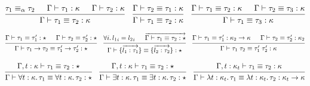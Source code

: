 \documentclass[lualatex,12pt,unicode]{article}
\begin{document}
\pagestyle{empty}

\[
    \begin{prooftree}
        \hypo{\tau_1 \equiv_\alpha \tau_2}
        \hypo{\Gamma \vdash \tau_1: \kappa}
        \hypo{\Gamma \vdash \tau_2: \kappa}
        \infer3{\Gamma \vdash \tau_1 \equiv \tau_2: \kappa}
    \end{prooftree}
    \hspace{1em}
    \begin{prooftree}
        \hypo{\Gamma \vdash \tau_2 \equiv \tau_1: \kappa}
        \infer1{\Gamma \vdash \tau_1 \equiv \tau_2: \kappa}
    \end{prooftree}
    \hspace{1em}
    \begin{prooftree}
        \hypo{\Gamma \vdash \tau_1 \equiv \tau_2: \kappa}
        \hypo{\Gamma \vdash \tau_2 \equiv \tau_3: \kappa}
        \infer2{\Gamma \vdash \tau_1 \equiv \tau_3: \kappa}
    \end{prooftree}
\]

\[
    \begin{prooftree}
        \hypo{\Gamma \vdash \tau_1 \equiv \tau_1': \star}
        \hypo{\Gamma \vdash \tau_2 \equiv \tau_2': \star}
        \infer2{\Gamma \vdash \tau_1 \to \tau_2 \equiv \tau_1' \to \tau_2': \star}
    \end{prooftree}
    \hspace{1em}
    \begin{prooftree}
        \hypo{\forall i\ldotp {l_1}_i = {l_2}_i}
        \hypo{\overrightarrow{\Gamma \vdash \tau_1 \equiv \tau_2: \star}}
        \infer2{\Gamma \vdash \{\overrightarrow{l_1: \tau_1}\} \equiv \{\overrightarrow{l_2: \tau_2}\}: \star}
    \end{prooftree}
    \hspace{1em}
    \begin{prooftree}
        \hypo{\Gamma \vdash \tau_1 \equiv \tau_1': \kappa_2 \to \kappa}
        \hypo{\Gamma \vdash \tau_2 \equiv \tau_2': \kappa_2}
        \infer2{\Gamma \vdash \tau_1\; \tau_2 \equiv \tau_1'\; \tau_2': \kappa}
    \end{prooftree}
\]

\[
    \begin{prooftree}
        \hypo{\Gamma, t: \kappa \vdash \tau_1 \equiv \tau_2: \star}
        \infer1{\Gamma \vdash \forall t: \kappa\ldotp \tau_1 \equiv \forall t: \kappa\ldotp \tau_2: \star}
    \end{prooftree}
    \hspace{1em}
    \begin{prooftree}
        \hypo{\Gamma, t: \kappa \vdash \tau_1 \equiv \tau_2: \star}
        \infer1{\Gamma \vdash \exists t: \kappa\ldotp \tau_1 \equiv \exists t: \kappa\ldotp \tau_2: \star}
    \end{prooftree}
    \hspace{1em}
    \begin{prooftree}
        \hypo{\Gamma, t: \kappa_t \vdash \tau_1 \equiv \tau_2: \kappa}
        \infer1{\Gamma \vdash \lambda t: \kappa_t\ldotp \tau_1 \equiv \lambda t: \kappa_t\ldotp \tau_2: \kappa_t \to \kappa}
    \end{prooftree}
\]
\end{document}
